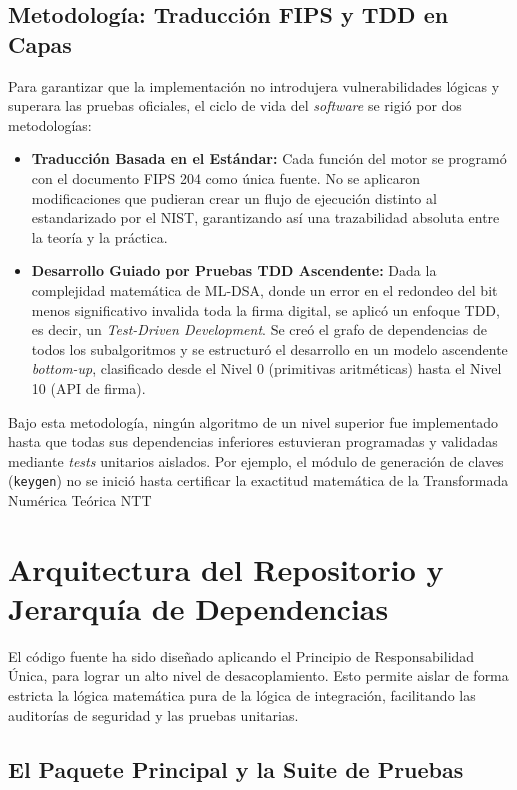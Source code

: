 \documentclass[11pt, a4paper]{report}
\theoremstyle{definition}
\begin{document}
\subsection{Metodología: Traducción FIPS y TDD en Capas}
\label{subsec:metodologia_tdd}

Para garantizar que la implementación no introdujera vulnerabilidades lógicas y superara las pruebas oficiales, el ciclo de vida del \textit{software} se rigió por dos metodologías:

\begin{itemize}
    \item \textbf{Traducción Basada en el Estándar:} Cada función del motor se programó con el documento FIPS 204 como única fuente. No se aplicaron modificaciones que pudieran crear un flujo de ejecución distinto al estandarizado por el NIST, garantizando así una trazabilidad absoluta entre la teoría y la práctica.
    \item \textbf{Desarrollo Guiado por Pruebas TDD Ascendente:} Dada la complejidad matemática de ML-DSA, donde un error en el redondeo del bit menos significativo invalida toda la firma digital, se aplicó un enfoque TDD, es decir, un \textit{Test-Driven Development}. Se creó el grafo de dependencias de todos los subalgoritmos y se estructuró el desarrollo en un modelo ascendente \textit{bottom-up}, clasificado desde el Nivel 0 (primitivas aritméticas) hasta el Nivel 10 (API de firma).
\end{itemize}

Bajo esta metodología, ningún algoritmo de un nivel superior fue implementado hasta que todas sus dependencias inferiores estuvieran programadas y validadas mediante \textit{tests} unitarios aislados. Por ejemplo, el módulo de generación de claves (\texttt{keygen}) no se inició hasta certificar la exactitud matemática de la Transformada Numérica Teórica NTT


\section{Arquitectura del Repositorio y Jerarquía de Dependencias}
\label{sec:arquitectura_repo}

El código fuente ha sido diseñado aplicando el Principio de Responsabilidad Única, para lograr un alto nivel de desacoplamiento. Esto permite aislar de forma estricta la lógica matemática pura de la lógica de integración, facilitando las auditorías de seguridad y las pruebas unitarias.

\subsection{El Paquete Principal y la Suite de Pruebas}
\end{document}
